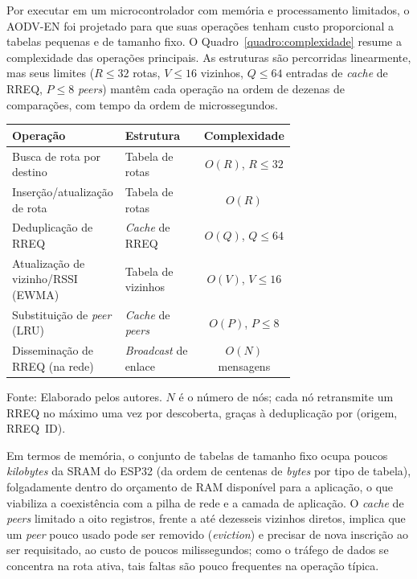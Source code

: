 Por executar em um microcontrolador com memória e processamento
limitados, o AODV-EN foi projetado para que suas operações tenham custo
proporcional a tabelas pequenas e de tamanho fixo. O
Quadro~\ref{quadro:complexidade} resume a complexidade das operações
principais. As estruturas são percorridas linearmente, mas seus limites
($R \le 32$ rotas, $V \le 16$ vizinhos, $Q \le 64$ entradas de
\emph{cache} de RREQ, $P \le 8$ \emph{peers}) mantêm cada operação na
ordem de dezenas de comparações, com tempo da ordem de microssegundos.

\begin{quadro}[H]
\centering
\caption{Complexidade das operações do AODV-EN}\label{quadro:complexidade}
\begin{tabular}{@{}>{\raggedright\arraybackslash}p{0.40\linewidth}>{\raggedright\arraybackslash}p{0.30\linewidth}c@{}}
\toprule
Operação & Estrutura & Complexidade \\
\midrule
Busca de rota por destino & Tabela de rotas & $O(R)$, $R \le 32$ \\
Inserção/atualização de rota & Tabela de rotas & $O(R)$ \\
Deduplicação de RREQ & \emph{Cache} de RREQ & $O(Q)$, $Q \le 64$ \\
Atualização de vizinho/RSSI (EWMA) & Tabela de vizinhos & $O(V)$, $V \le 16$ \\
Substituição de \emph{peer} (LRU) & \emph{Cache} de \emph{peers} & $O(P)$, $P \le 8$ \\
Disseminação de RREQ (na rede) & \emph{Broadcast} de enlace & $O(N)$ mensagens \\
\bottomrule
\end{tabular}

\vspace{2pt}
{\footnotesize Fonte: Elaborado pelos autores. $N$ é o número de nós; cada nó retransmite um RREQ no máximo uma vez por descoberta, graças à deduplicação por (origem, RREQ~ID).}
\end{quadro}

Em termos de memória, o conjunto de tabelas de tamanho fixo ocupa poucos
\emph{kilobytes} da SRAM do ESP32 (da ordem de centenas de \emph{bytes}
por tipo de tabela), folgadamente dentro do orçamento de RAM disponível
para a aplicação, o que viabiliza a coexistência com a pilha de rede e a
camada de aplicação. O \emph{cache} de \emph{peers} limitado a oito
registros, frente a até dezesseis vizinhos diretos, implica que um
\emph{peer} pouco usado pode ser removido (\emph{eviction}) e precisar de
nova inscrição ao ser requisitado, ao custo de poucos milissegundos; como
o tráfego de dados se concentra na rota ativa, tais faltas são pouco
frequentes na operação típica.

